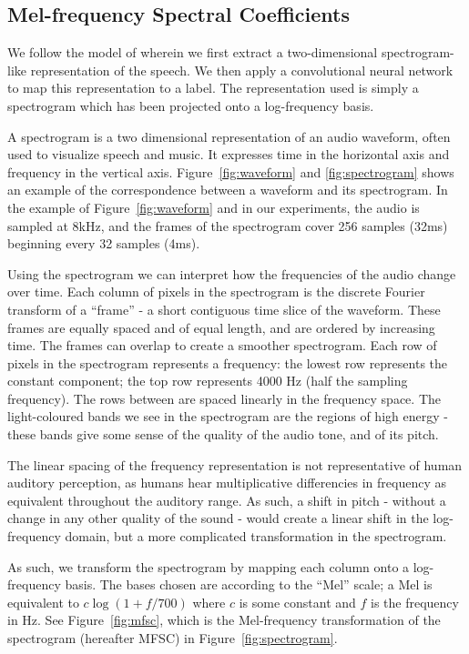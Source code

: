 \subsection{Mel-frequency Spectral Coefficients}

We follow the model of \cite{abdel2014convolutional} wherein we first extract a two-dimensional spectrogram-like representation of the speech. We then apply a convolutional neural network to map this representation to a label. The representation used is simply a spectrogram which has been projected onto a log-frequency basis.

A spectrogram is a two dimensional representation of an audio waveform, often used to visualize speech and music. It expresses time in the horizontal axis and frequency in the vertical axis. Figure~\ref{fig:waveform} and \ref{fig:spectrogram} shows an example of the correspondence between a waveform and its spectrogram. In the example of Figure~\ref{fig:waveform} and in our experiments, the audio is sampled at 8kHz, and the frames of the spectrogram cover 256 samples (32ms) beginning every 32 samples (4ms).

Using the spectrogram we can interpret how the frequencies of the audio change over time. Each column of pixels in the spectrogram is the discrete Fourier transform of a ``frame'' - a short contiguous time slice of the waveform. These frames are equally spaced and of equal length, and are ordered by increasing time. The frames can overlap to create a smoother spectrogram. Each row of pixels in the spectrogram represents a frequency: the lowest row represents the constant component; the top row represents 4000 Hz (half the sampling frequency). The rows between are spaced linearly in the frequency space. The light-coloured bands we see in the spectrogram are the regions of high energy - these bands give some sense of the quality of the audio tone, and of its pitch.

The linear spacing of the frequency representation is not representative of human auditory perception, as humans hear multiplicative differencies in frequency as equivalent throughout the auditory range. As such, a shift in pitch - without a change in any other quality of the sound - would create a linear shift in the log-frequency domain, but a more complicated transformation in the spectrogram.

As such, we transform the spectrogram by mapping each column onto a log-frequency basis. The bases chosen are according to the ``Mel'' scale; a Mel is equivalent to $c \log(1 + f / 700)$ where $c$ is some constant and $f$ is the frequency in Hz. See Figure~\ref{fig:mfsc}, which is the Mel-frequency transformation of the spectrogram (hereafter MFSC) in Figure~\ref{fig:spectrogram}.


